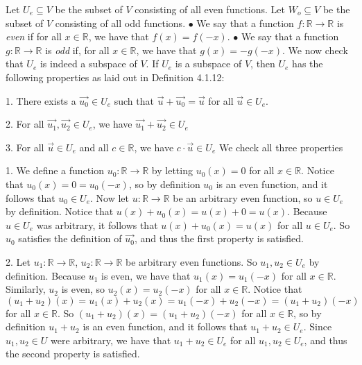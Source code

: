 \documentclass[12pt]{article}
\newenvironment{problem}[2][Problem]
{
	\begin{trivlist} 
		\item[\hskip \labelsep {\bfseries #1 #2:}]
	}
{
	\end{trivlist}
	}
\begin{document}
\begin{problem}{2}
\newpage
Let $U_e\subseteq V$ be the subset of $V$ consisting of all even functions. Let $W_o\subseteq V$ be the subset of $V$ consisting of all odd functions.
\newline
\newline
\noindent
$\bullet$ We say that a function $f: \mathbb{R} \to \mathbb{R}$ is {\it even} if for all $x \in \mathbb{R}$, we have that $f(x)=f(-x)$.
\newline
\newline
\noindent
$\bullet$ We say that a function $g: \mathbb{R} \to \mathbb{R}$ is {\it odd} if, for all $x \in \mathbb{R}$, we have that $g(x)=-g(-x)$.
\noindent
\newline
\newline
We now check that $U_e$ is indeed a subspace of $V$. If $U_e$ is a subspace of $V$, then $U_e$ has the following properties as laid out in Definition 4.1.12:

1. There exists a $\vec{u_0} \in U_e$ such that $\vec{u} + \vec{u_0} = \vec{u}$ for all $\vec{u} \in U_e$.

2. For all $\vec{u_1},\vec{u_2} \in U_e$, we have $\vec{u_1}+\vec{u_2} \in U_e$

3. For all $\vec{u} \in U_e$ and all $c \in \mathbb{R}$, we have $c\cdot \vec{u} \in U_e$
\noindent
\newline
\newline
We check all three properties

1. We define a function $u_0 :\mathbb{R} \to \mathbb{R}$ by letting $u_0 (x)=0$ for all $x \in \mathbb{R}$. Notice that $u_0 (x) = 0 = u_0(-x)$, so by definition $u_0$ is an even function, and it follows that $u_0 \in U_e$. Now let $u:\mathbb{R} \to \mathbb{R}$ be an arbitrary even function, so $u \in U_e$ by definition. Notice that $u(x) + u_0 (x) = u(x) + 0 = u(x)$. Because $u \in U_e$ was arbitrary, it follows that $u(x)+u_0(x) = u(x)$ for all $u \in U_e$. So $u_0$ satisfies the definition of $\vec{u_0}$, and thus the first property is satisfied.

2. Let $u_1:\mathbb{R} \to \mathbb{R}$,  $u_2:\mathbb{R} \to \mathbb{R}$ be arbitrary even functions. So $u_1,u_2 \in U_e$ by definition. %
Because $u_1$ is even, we have that $u_1(x) = u_1 (-x)$ for all $x \in \mathbb{R}$. Similarly, $u_2$ is even, so $u_2 (x) = u_2 (-x)$ for all $x \in \mathbb{R}$. Notice that $(u_1 +u_2)(x) = u_1(x) + u_2 (x) = u_1 (-x) + u_2 (-x)= (u_1 +u_2)(-x)$ for all $x \in \mathbb{R}$. So $(u_1+u_2)(x) = (u_1+u_2)(-x)$ for all $x \in \mathbb{R}$, so by definition $u_1 + u_2$ is an even function, and it follows that $u_1 + u_2 \in U_e$. Since $u_1,u_2 \in U$ were arbitrary, we have that $u_1 + u_2 \in U_e$ for all $u_1,u_2 \in U_e$, and thus the second property is satisfied.


\end{problem}
\end{document}
